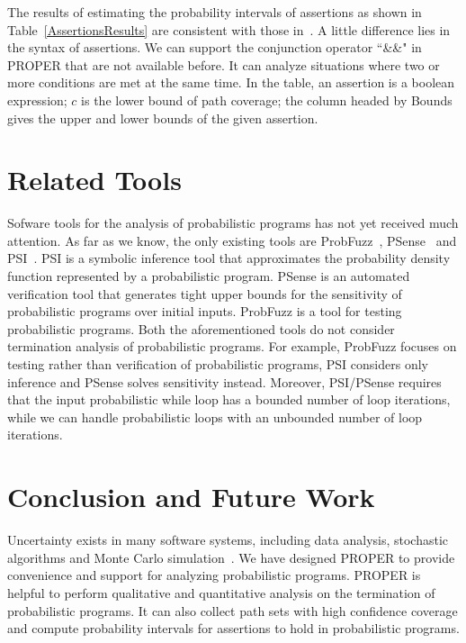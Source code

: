\documentclass[sigconf,review, anonymous]{acmart}
\begin{document}
The results of estimating the probability intervals of assertions as shown in Table~\ref{AssertionsResults} are consistent with those in~\cite{Sankaranarayanan2013Static}. A little difference lies in the syntax of assertions. We can support the conjunction operator  ``\&\&" in PROPER that are not available before. It can analyze situations where two or more conditions are met at the same time. In the table, an assertion is a boolean expression; $c$ is the lower bound of path coverage; the column headed by Bounds gives the upper and lower bounds of the given assertion.%

\section{Related Tools}
Sofware tools for the analysis of probabilistic programs has not yet received much attention. 
As far as we know, the only existing tools are ProbFuzz~\cite{DBLP:conf/sigsoft/DuttaLHM18}, PSense~\cite{DBLP:conf/atva/HuangWM18} and PSI~\cite{DBLP:conf/cav/GehrMV16}.
PSI is a symbolic inference tool that approximates the probability density function represented by a probabilistic program. 
PSense is an automated verification tool that generates tight upper bounds for the sensitivity of probabilistic programs over initial inputs.
ProbFuzz is a tool for testing probabilistic programs. 
Both the aforementioned tools do not consider termination analysis of probabilistic programs. 
For example, ProbFuzz focuses on testing rather than verification of probabilistic programs, 
PSI considers only inference and PSense solves sensitivity instead. 
Moreover, PSI/PSense requires that the input probabilistic while loop has a bounded number of loop iterations, while we can handle probabilistic loops with an unbounded number of loop iterations.

\section{Conclusion and Future Work}
Uncertainty exists in many software systems, including data analysis, stochastic algorithms and Monte Carlo simulation~\cite{HASTINGS1970Monte}. We have designed PROPER  to provide convenience and support for analyzing probabilistic programs.
PROPER is helpful to perform qualitative and quantitative analysis on the termination of probabilistic programs. It can also collect path sets with high confidence coverage and compute  probability intervals for assertions to hold in probabilistic programs.
\end{document}
